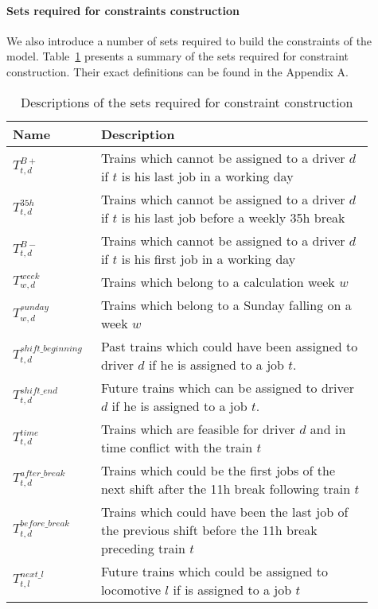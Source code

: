 \paragraph{Sets required for constraints construction}
We also introduce a number of sets required to build the constraints of the model. Table~\ref{tab:sets_descriptions} presents a summary of the sets required for constraint construction. Their exact definitions can be found in the Appendix A.
\begin{table}[ht]

\begin{tabular}{p{0.2\linewidth} | p{0.7\linewidth}}
\toprule
Name                          & Description                                                                                              \\ \midrule
$T^{B+}_{t, d}$               & Trains which cannot be assigned to a driver $d$ if $t$ is his last job in a working day                  \\ \hline
$T^{35h}_{t, d}$              & Trains which cannot be assigned to a driver $d$ if $t$ is his last job before a weekly 35h break         \\ \hline
$T^{B-}_{t, d}$               & Trains which cannot be assigned to a driver $d$ if $t$ is his first job in a working day                 \\ \hline
$T^{week}_{w, d}$             & Trains which belong to a calculation week $w$                                                            \\ \hline
$T^{sunday}_{w, d}$           & Trains which belong to a Sunday falling on a week $w$                                                    \\ \hline
$T^{shift\_beginning}_{t, d}$ & Past trains which could have been assigned to driver $d$ if he is assigned to a job $t$.                 \\ \hline
$T^{shift\_end}_{t, d}$       & Future trains which can be assigned to driver $d$ if he is assigned to a job $t$.                        \\ \hline
$T^{time}_{t, d}$             & Trains which are feasible for driver $d$ and in time conflict with the train $t$                         \\ \hline
$T^{after\_break}_{t, d}$     & Trains which could be the first jobs of the next shift after the 11h break following train $t$           \\ \hline
$T^{before\_break}_{t, d}$    & Trains which could have been the last job of the previous shift before the 11h break preceding train $t$ \\ \hline
$T^{next\_l}_{t, l}$          & Future trains which could be assigned to locomotive $l$ if is assigned to a job $t$                      \\ 
\bottomrule

\end{tabular}
\caption{Descriptions of the sets required for constraint construction}
\label{tab:sets_descriptions}
\end{table}

